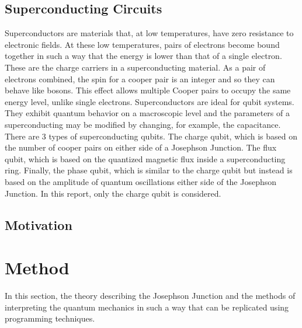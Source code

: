 \documentclass[11pt]{article}
\begin{document}
 \subsection{Superconducting Circuits}
Superconductors are materials that, at low temperatures, have zero resistance to electronic fields. At these low temperatures, pairs of electrons become bound together in such a way that the energy is lower than that of a single electron. These are the charge carriers in a superconducting material. As a pair of electrons combined, the spin for a cooper pair is an integer and so they can behave like bosons. This effect allows multiple Cooper pairs to occupy the same energy level, unlike single electrons. Superconductors are ideal for qubit systems. They exhibit quantum behavior on a macroscopic level and the parameters of a superconducting may be modified by changing, for example, the capacitance. There are 3 types of superconducting qubits. The charge qubit, which is based on the number of cooper pairs on either side of a Josephson Junction. The flux qubit, which is based on the quantized magnetic flux inside a superconducting ring. Finally, the phase qubit, which is similar to the charge qubit but instead is based on the amplitude of quantum oscillations either side of the Josephson Junction. In this report, only the charge qubit is considered.

  \subsection{Motivation}

    \section{Method}
    In this section, the theory describing the Josephson Junction and the methods of interpreting the quantum mechanics in such a way that can be replicated using programming techniques.
\end{document}
